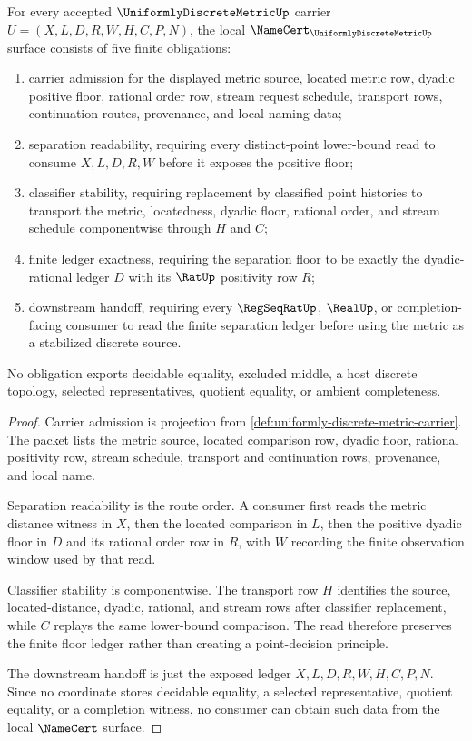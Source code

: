 \begin{theorem}
\label{thm:uniformly-discrete-metric-namecert-obligations}
For every accepted $\UniformlyDiscreteMetricUp$ carrier $U=(X,L,D,R,W,H,C,P,N)$, the local $\NameCert_{\UniformlyDiscreteMetricUp}$ surface consists of five finite obligations:
\begin{enumerate}
\item carrier admission for the displayed metric source, located metric row, dyadic positive floor, rational order row, stream request schedule, transport rows, continuation routes, provenance, and local naming data;
\item separation readability, requiring every distinct-point lower-bound read to consume $X,L,D,R,W$ before it exposes the positive floor;
\item classifier stability, requiring replacement by classified point histories to transport the metric, locatedness, dyadic floor, rational order, and stream schedule componentwise through $H$ and $C$;
\item finite ledger exactness, requiring the separation floor to be exactly the dyadic-rational ledger $D$ with its $\RatUp$ positivity row $R$;
\item downstream handoff, requiring every $\RegSeqRatUp$, $\RealUp$, or completion-facing consumer to read the finite separation ledger before using the metric as a stabilized discrete source.
\end{enumerate}
No obligation exports decidable equality, excluded middle, a host discrete topology, selected representatives, quotient equality, or ambient completeness.
\end{theorem}
\begin{proof}
Carrier admission is projection from \autoref{def:uniformly-discrete-metric-carrier}. The packet lists the metric source, located comparison row, dyadic floor, rational positivity row, stream schedule, transport and continuation rows, provenance, and local name.

Separation readability is the route order. A consumer first reads the metric distance witness in $X$, then the located comparison in $L$, then the positive dyadic floor in $D$ and its rational order row in $R$, with $W$ recording the finite observation window used by that read.

Classifier stability is componentwise. The transport row $H$ identifies the source, located-distance, dyadic, rational, and stream rows after classifier replacement, while $C$ replays the same lower-bound comparison. The read therefore preserves the finite floor ledger rather than creating a point-decision principle.

The downstream handoff is just the exposed ledger $X,L,D,R,W,H,C,P,N$. Since no coordinate stores decidable equality, a selected representative, quotient equality, or a completion witness, no consumer can obtain such data from the local $\NameCert$ surface.
\end{proof}

